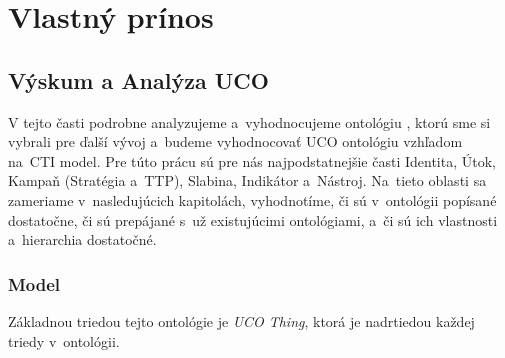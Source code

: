 \documentclass[12pt, a4paper, oneside]{book}
\begin{document}

\part{Vlastný prínos}
\chapter{Výskum a Analýza UCO}

V tejto časti podrobne analyzujeme a~vyhodnocujeme ontológiu \citep{ucoSource}, ktorú sme si vybrali pre ďalší vývoj a~budeme vyhodnocovať UCO ontológiu vzhľadom na~CTI model. Pre túto prácu sú pre nás najpodstatnejšie časti Identita, Útok, Kampaň (Stratégia a~TTP), Slabina, Indikátor a~Nástroj. Na~tieto oblasti sa zameriame v~nasledujúcich kapitolách, vyhodnotíme, či sú v~ontológii popísané dostatočne, či sú prepájané s~už existujúcimi ontológiami, a~či sú ich vlastnosti a~hierarchia dostatočné. 


\section{Model}

Základnou triedou tejto ontológie je \textit{UCO Thing}, ktorá je nadrtiedou každej triedy v~ontológii.
\end{document}
